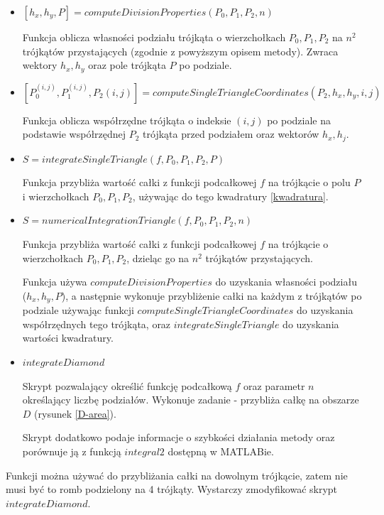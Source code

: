 \documentclass[12pt]{article}
\begin{document}
	\begin{itemize}
		\item $[h_x, h_y, P] = computeDivisionProperties(P_0, P_1, P_2, n)$
		
		Funkcja oblicza własności podziału trójkąta o wierzchołkach $P_0, P_1, P_2$ na $n^2$ trójkątów przystających (zgodnie z powyższym opisem metody). Zwraca wektory $h_x, h_y$ oraz pole trójkąta $P$ po podziale.
		
		
		\item $[P_0^{(i,j)}, P_1^{(i,j)}, P_2{(i,j)}] = computeSingleTriangleCoordinates(P_2, h_x, h_y, i, j)$
		
		Funkcja oblicza współrzędne trójkąta o indeksie $(i, j)$ po podziale na podstawie współrzędnej $P_2$ trójkąta przed podziałem oraz wektorów $h_x, h_j$.
		
		
		\item $S = integrateSingleTriangle(f, P_0, P_1, P_2, P)$
		
		Funkcja przybliża wartość całki z funkcji podcałkowej $f$ na trójkącie o polu $P$ i wierzchołkach $P_0, P_1, P_2$, używając do tego kwadratury \eqref{kwadratura}.
		
		
		\item $S = numericalIntegrationTriangle(f, P_0, P_1, P_2, n)$
		
		Funkcja przybliża wartość całki z funkcji podcałkowej $f$ na trójkącie o wierzchołkach $P_0, P_1, P_2$, dzieląc go na $n^2$ trójkątów przystających.
		
		Funkcja używa $computeDivisionProperties$ do uzyskania własności podziału ($h_x, h_y, P$), a następnie wykonuje przybliżenie całki na każdym z trójkątów po podziale używając funkcji $computeSingleTriangleCoordinates$ do uzyskania współrzędnych tego trójkąta, oraz $integrateSingleTriangle$ do uzyskania wartości kwadratury.
		
		\item $integrateDiamond$
		
		Skrypt pozwalający określić funkcję podcałkową $f$ oraz parametr $n$ określający liczbę podziałów. Wykonuje zadanie - przybliża całkę na obszarze $D$ (rysunek \ref{D-area}).
		
		Skrypt dodatkowo podaje informacje o szybkości działania metody oraz porównuje ją z funkcją $integral2$ dostępną w MATLABie.
	\end{itemize}

	Funkcji można używać do przybliżania całki na dowolnym trójkącie, zatem nie musi być to romb podzielony na 4 trójkąty. Wystarczy zmodyfikować skrypt $integrateDiamond$.
	
\end{document}
